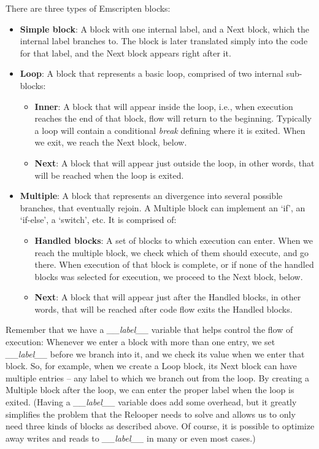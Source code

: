 \documentclass[11pt]{proc}
\begin{document}
There are three types of Emscripten blocks:
\begin{itemize}
\item \textbf{Simple block}: A block with one internal label, and a Next
      block, which the internal label branches to. The block is later
      translated simply into the code for that label, and the Next
      block appears right after it.
\item \textbf{Loop}: A block that represents a basic loop, comprised of
      two internal sub-blocks:
  \begin{itemize}
  \item \textbf{Inner}: A block that will appear inside
        the loop, i.e., when execution reaches the end of that block,
        flow will return to the beginning. Typically a loop will contain
        a conditional \emph{break} defining where it is exited. When we
        exit, we reach the Next block, below.
  \item \textbf{Next}: A block that will appear just outside
        the loop, in other words, that will be reached when the loop is exited.
  \end{itemize}
\item \textbf{Multiple}: A block that represents an divergence into several
      possible branches, that eventually rejoin. A Multiple block can
      implement an `if', an `if-else', a `switch', etc. It is comprised of:
  \begin{itemize}
  \item \textbf{Handled blocks}: A set of blocks to which execution can
        enter. When we reach the multiple block, we check which of them
        should execute, and go there. When execution of that block is
        complete, or if none of the handled blocks was selected for
        execution, we proceed to the Next block, below.
  \item \textbf{Next}: A block that will appear just after the Handled blocks,
        in other words, that will be reached after code flow
        exits the Handled blocks.
  \end{itemize}
\end{itemize}
Remember that we have a \emph{\_\_label\_\_} variable that helps control
the flow of execution: Whenever we enter a block with more than one
entry, we set \emph{\_\_label\_\_} before we branch into it, and we
check its value when we enter that block. So, for example, when we
create a Loop block, its Next block can have multiple entries -- any
label to which we branch out from the loop. By creating a Multiple
block after the loop, we can enter the proper label when the loop is
exited. (Having a \emph{\_\_label\_\_} variable does add some overhead,
but it greatly simplifies the problem that the Relooper needs to solve
and allows us to only need three kinds of blocks as described above.
Of course, it is possible to optimize
away writes and reads to \emph{\_\_label\_\_} in many or even most cases.)
\end{document}
